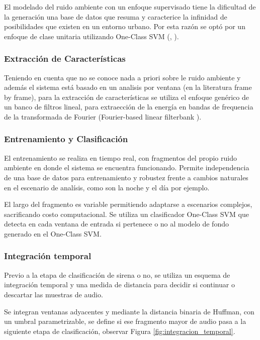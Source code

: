 \documentclass{article}
\begin{document}
El modelado del ruido ambiente con un enfoque supervisado tiene la dificultad de  la generación una base de datos que resuma y caracterice la infinidad de posibilidades que existen en un entorno urbano. Por esta razón se optó por un enfoque de clase unitaria utilizando One-Class SVM (\cite{rabaoui2008one}, \citep{lecomte2011abnormal}).

\subsubsection*{Extracción de Características}
Teniendo en cuenta que no se conoce nada a priori sobre le ruido ambiente y además el sistema está basado en un analisis por ventana (en la literatura frame by frame), para la extracción de características se utiliza el enfoque genérico de un banco de filtros lineal, para extraección de la energía en bandas de frequencia de la transformada de Fourier (Fourier-based linear filterbank \citep{lecomte2011abnormal}).

\subsubsection*{Entrenamiento y Clasificación}
El entrenamiento se realiza en tiempo real, con fragmentos del propio ruido ambiente en donde el sistema se encuentra funcionando. Permite independencia de una base de datos para entrenamiento y robustez frente a cambios naturales en el escenario de analísis, como son la noche y el día por ejemplo. 
\smallskip

El largo del fragmento es variable permitiendo adaptarse a escenarios complejos, sacrificando costo computacional. Se utiliza un clasificador One-Class SVM que detecta en cada ventana de entrada si pertenece o no al modelo de fondo generado en el One-Class SVM.

\subsubsection{Integración temporal}

Previo a la etapa de clasificación de sirena o no, se utiliza un esquema de integración temporal y una medida de distancia para decidir si continuar o descartar las muestras de audio.

\smallskip
Se integran ventanas adyacentes y mediante la distancia binaria de Huffman, con un umbral parametrizable, se define si ese fragmento mayor de audio pasa a la siguiente etapa de clasificación, observar Figura \ref{fig:integracion_temporal}. 
\end{document}
